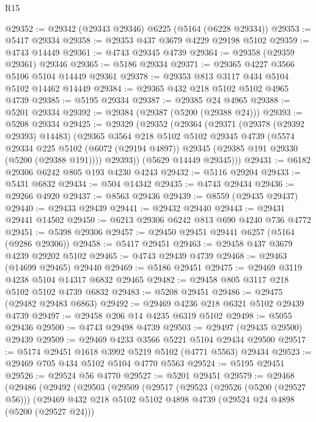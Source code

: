 \begin{lexlean}{R15}
\begin{coremodule}
{{{{{{{{{{{@29352 := @29342 (@29343 @29346) @6225 (@5164 (@6228 @29334))
@29353 := @5417 @29334
@29358 := @29353 @437 @3679 @4229 @29198 @5102
@29359 := @4743 @14449
@29361 := @4743 @29345 @4739
@29364 := @29358 (@29359 @29361) @29346
@29365 := @5186 @29334
@29371 := @29365 @4227 @3566 @5106 @5104 @14449 @29361
@29378 := @29353 @813 @3117 @434 @5104 @5102 @14462 @14449
@29384 := @29365 @432 @218 @5102 @5102 @4965 @4739
@29385 := @5195 @29334
@29387 := @29385 @24 @4965
@29388 := @5201 @29334
@29392 := @29384 (@29387 (@5200 (@29388 @24)))
@29393 := @5208 @29334
@29425 := @29329
    (@29352
      (@29364
        (@29371
          (@29378 (@29392 @29393) @14483)
          (@29365
            @3564
            @218
            @5102
            @5102
            @29345
            @4739
            (@5574
              @29334
              @225
              @5102
              (@6072 (@29194 @4897))
              @29345
              (@29385 @191 @29330 (@5200 (@29388 @191))))
            @29393))
        (@5629 @14449 @29345)))
@29431 := @6182 @29306 @6242 @805 @193 @4230 @4243
@29432 := @5116 @29204
@29433 := @5431 @6832
@29434 := @504 @14342
@29435 := @4743 @29434
@29436 := @29266 @4920
@29437 := @8563 @29436
@29439 := @8559 (@29435 @29437)
@29440 := @29433 @29439
@29441 := @29432 @29440
@29443 := @29431 @29441 @14502
@29450 := @6213 @29306 @6242 @813 @690 @4240 @736 @4772
@29451 := @5398 @29306
@29457 := @29450 @29451 @29441 @6257 (@5164 (@9286 @29306))
@29458 := @5417 @29451
@29463 := @29458 @437 @3679 @4239 @29202 @5102
@29465 := @4743 @29439 @4739
@29468 := @29463 (@14699 @29465) @29440
@29469 := @5186 @29451
@29475 := @29469 @3119 @4238 @5104 @14317 @6832 @29465
@29482 := @29458 @805 @3117 @218 @5102 @5102 @4739 @6832
@29483 := @5208 @29451
@29486 := @29475 (@29482 @29483 @6863)
@29492 := @29469 @4236 @218 @6321 @5102 @29439 @4739
@29497 := @29458 @206 @14 @4235 @6319 @5102
@29498 := @5055 @29436
@29500 := @4743 @29498 @4739
@29503 := @29497 (@29435 @29500) @29439
@29509 := @29469 @4233 @3566 @5221 @5104 @29434 @29500
@29517 := @5174 @29451 @1618 @3992 @5219 @5102 (@4771 @5563) @29434
@29523 := @29469 @705 @434 @5102 @5104 @4770 @5563
@29524 := @5195 @29451
@29526 := @29524 @56 @4770
@29527 := @5201 @29451
@29579 := @29468
    (@29486
      (@29492
        (@29503
          (@29509
            (@29517
              (@29523
                (@29526 (@5200 (@29527 @56)))
                (@29469
                  @432
                  @218
                  @5102
                  @5102
                  @4898
                  @4739
                  (@29524 @24 @4898 (@5200 (@29527 @24)))
}}}}}}}}}}}
\end{coremodule}
\end{lexlean}
